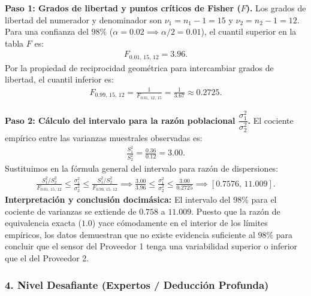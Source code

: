 \begin{solproblema}
	\textbf{Paso 1: Grados de libertad y puntos críticos de Fisher ($F$).}
	Los grados de libertad del numerador y denominador son $\nu_1 = n_1 - 1 = 15$ y $\nu_2 = n_2 - 1 = 12$.
	Para una confianza del $98\%$ ($\alpha = 0.02 \implies \alpha/2 = 0.01$), el cuantil superior en la tabla $F$ es:
	\begin{align}
		F_{0.01, \, 15, \, 12} = 3.96.
	\end{align}
	Por la propiedad de reciprocidad geométrica para intercambiar grados de libertad, el cuantil inferior es:
	\begin{align}
		F_{0.99, \, 15, \, 12} = \frac{1}{F_{0.01, \, 12, \, 15}} = \frac{1}{3.67} \approx 0.2725.
	\end{align}
	
	\textbf{Paso 2: Cálculo del intervalo para la razón poblacional $\dfrac{\sigma_1^2}{\sigma_2^2}$.}
	El cociente empírico entre las varianzas muestrales observadas es:
	\begin{align}
		\frac{S_1^2}{S_2^2} = \frac{0.36}{0.12} = 3.00.
	\end{align}
	Sustituimos en la fórmula general del intervalo para razón de dispersiones:
	\begin{align}
		\frac{S_1^2 / S_2^2}{F_{0.01, \, 15, \, 12}} \le \frac{\sigma_1^2}{\sigma_2^2} \le \frac{S_1^2 / S_2^2}{F_{0.99, \, 15, \, 12}} \implies \frac{3.00}{3.96} \le \frac{\sigma_1^2}{\sigma_2^2} \le \frac{3.00}{0.2725} \implies [0.7576, \, 11.009].
	\end{align}
	\textbf{Interpretación y conclusión docimásica:} El intervalo del 98\% para el cociente de varianzas se extiende de $0.758$ a $11.009$. Puesto que la razón de equivalencia exacta ($1.0$) yace cómodamente en el interior de los límites empíricos, los datos demuestran que no existe evidencia suficiente al $98\%$ para concluir que el sensor del Proveedor 1 tenga una variabilidad superior o inferior que el del Proveedor 2.
\end{solproblema}

\subsubsection*{4. Nivel Desafiante (Expertos / Deducción Profunda)}

